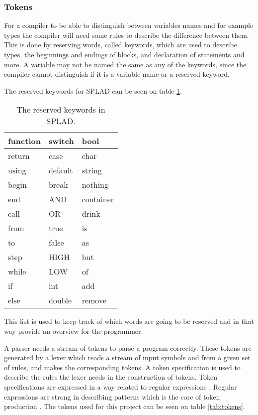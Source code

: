 \subsubsection{Tokens}
For a compiler to be able to distinguish between variables names and for example types the compiler will need some rules to describe the difference between them. This is done by reserving words, called keywords, which are used to describe types, the beginnings and endings of blocks, and declaration of statements and more. A variable may not be named the same as any of the keywords, since the compiler cannot distinguish if it is a variable name or a reserved keyword.

The reserved keywords for SPLAD can be seen on table \ref{tab:keywords}.

\begin{table}[H]
	\begin{tabular}{|l|l|l|}
		\hline
		function	&	switch		&	bool	    \\ \hline
		return 		&	case		&	char	    \\ \hline
		using 		&	default		&	string	    \\ \hline
		begin 		&	break	    &	nothing    	\\ \hline
		end 		&	AND		    &	container	\\ \hline
		call 		&	OR			&	drink	    \\ \hline
		from     	&	true		&	is	        \\ \hline
		to         	&	false		&	as    	    \\ \hline
		step 		&	HIGH		&	but    	    \\ \hline
		while 		&	LOW			&	of		    \\ \hline
		if 	    	&	int			&	add	        \\ \hline
		else 		&	double		&	remove	    \\ \hline
	\end{tabular}
	\caption{The reserved keywords in SPLAD.}
	\label{tab:keywords}
\end{table}

This list is used to keep track of which words are going to be reserved and in that way provide an overview for the programmer. 

A parser needs a stream of tokens to parse a program correctly. These tokens are generated by a lexer which reads a stream of input symbols and from a given set of rules, and makes the corresponding tokens. A token specification is used to describe the rules the lexer needs in the construction of tokens. Token specifications are expressed in a way related to regular expressions \citep{sebesta}. Regular expressions are strong in describing patterns which is the core of token production \citep{sipser}. The tokens used for this project can be seen on table \ref{tab:tokens}.

